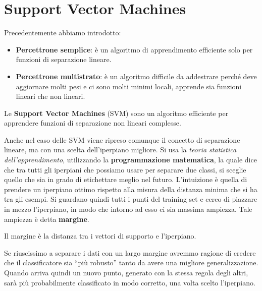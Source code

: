 \chapter{Support Vector Machines}
Precedentemente abbiamo introdotto:
\begin{itemize}
    \item \textbf{Percettrone semplice}: è un algoritmo di apprendimento efficiente
          solo per funzioni di separazione lineare.
    \item \textbf{Percettrone multistrato}: è un algoritmo difficile da addestrare
          perché deve aggiornare molti pesi e ci sono molti minimi locali, apprende
          sia funzioni lineari che non lineari.
\end{itemize}
Le \textbf{Support Vector Machines} (SVM) sono un algoritmo efficiente per
apprendere funzioni di separazione non lineari complesse.

Anche nel caso delle SVM viene ripreso comunque il concetto di separazione lineare,
ma con una scelta dell'iperpiano migliore. Si usa la \textit{teoria statistica
    dell'apprendimento}, utilizzando la \textbf{programmazione matematica}, la quale
dice che tra tutti gli iperpiani che possiamo usare per separare due classi, si
sceglie quello che sia in grado di etichettare meglio nel futuro. L'intuizione
è quella di prendere un iperpiano ottimo rispetto alla misura della distanza minima
che si ha tra gli esempi. Si guardano quindi tutti i punti del training set e
cerco di piazzare in mezzo l'iperpiano, in modo che intorno ad esso ci sia massima
ampiezza. Tale ampiezza è detta \textbf{margine}.
\begin{definizione}
    Il margine è la distanza tra i vettori di supporto e l'iperpiano.
\end{definizione}
Se riuscissimo a separare i dati con un largo margine avremmo ragione di credere
che il classificatore sia “più robusto” tanto da avere una migliore generalizzazione.
Quando arriva quindi un nuovo punto, generato con la stessa regola degli altri,
sarà più probabilmente classificato in modo corretto, una volta scelto l'iperpiano.

